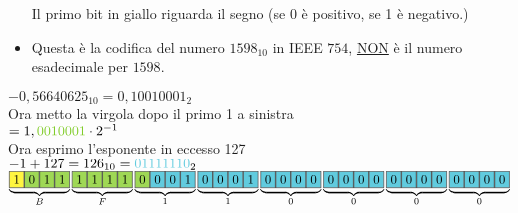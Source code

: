 \documentclass[a4paper, 12pt]{article} %
\begin{document}
\begin{itemize}
\textsf{\normalsize{Il primo bit in giallo riguarda il segno (se 0 è positivo, se 1 è negativo.)}} \\
	
\item \textsf{\normalsize{\color{red}Questa è la codifica del numero \normalcolor$1598_{10}$ in IEEE $754$, \underline{NON} \color{red}è il numero esadecimale per \normalcolor$1598$.}} \break

\begin{comment}
\begin{tcolorbox}[colback=yellow!75!,colframe=black!75!black]
	My box.
\end{tcolorbox}
\end{comment}



\end{itemize}

$-0,56640625_{10} = 0,10010001_2$ \\

\textsf{\normalsize{Ora metto la virgola dopo il primo 1 a sinistra}} \\

$= 1,\color{LimeGreen}0010001\normalcolor \cdot 2^{-1} $ \\

\textsf{\normalsize{Ora esprimo l'esponente in eccesso 127}} \\

$ -1 + 127 = 126_{10} = \color{SkyBlue}01111110\normalcolor_2 $ \\

$\underbrace{\fcolorbox{black}{yellow!75}{1} 
	\fcolorbox{black}{LimeGreen!75}{0} \fcolorbox{black}{LimeGreen!75}{1} \fcolorbox{black}{LimeGreen!75}{1}} _{B} \underbrace{\fcolorbox{black}{LimeGreen!75}{1} \fcolorbox{black}{LimeGreen!75}{1} \fcolorbox{black}{LimeGreen!75}{1}
	\fcolorbox{black}{LimeGreen!75}{1}} _{F} \underbrace{\fcolorbox{black}{LimeGreen!75}{0}
	\fcolorbox{black}{SkyBlue}{0} \fcolorbox{black}{SkyBlue}{0}
	\fcolorbox{black}{SkyBlue}{1}} _{1} \underbrace{\fcolorbox{black}{SkyBlue}{0}
	\fcolorbox{black}{SkyBlue}{0} \fcolorbox{black}{SkyBlue}{0}
	\fcolorbox{black}{SkyBlue}{1}} _{1} \underbrace{\fcolorbox{black}{SkyBlue}{0}
	\fcolorbox{black}{SkyBlue}{0} \fcolorbox{black}{SkyBlue}{0}
	\fcolorbox{black}{SkyBlue}{0}} _{0} \underbrace{\fcolorbox{black}{SkyBlue}{0}
	\fcolorbox{black}{SkyBlue}{0} \fcolorbox{black}{SkyBlue}{0}
	\fcolorbox{black}{SkyBlue}{0}} _{0} \underbrace{\fcolorbox{black}{SkyBlue}{0}
	\fcolorbox{black}{SkyBlue}{0} \fcolorbox{black}{SkyBlue}{0}
	\fcolorbox{black}{SkyBlue}{0}} _{0} \underbrace{\fcolorbox{black}{SkyBlue}{0}
	\fcolorbox{black}{SkyBlue}{0} \fcolorbox{black}{SkyBlue}{0}
	\fcolorbox{black}{SkyBlue}{0}} _{0}$ \quad
\end{document}
